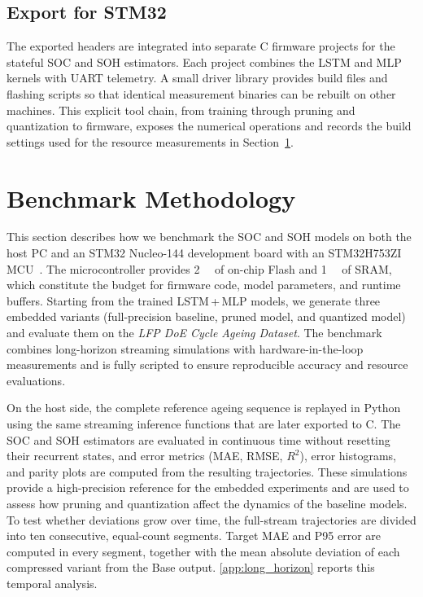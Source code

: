 \documentclass[final,3p,times]{elsarticle}
\begin{document}
\subsection{Export for STM32}
The exported headers are integrated into separate C firmware projects for the stateful SOC and SOH estimators. Each project combines the LSTM and MLP kernels with UART telemetry. A small driver library provides build files and flashing scripts so that identical measurement binaries can be rebuilt on other machines. This explicit tool chain, from training through pruning and quantization to firmware, exposes the numerical operations and records the build settings used for the resource measurements in Section~\ref{sec:kpis}.
\section{Benchmark Methodology}\label{sec:kpis}
This section describes how we benchmark the SOC and SOH models on both the host PC and an STM32 Nucleo-144 development board with an STM32H753ZI MCU~\cite{STM32Nucleo144Boards2025_Datasheet,naguibMicroprocessorExecutionTime2022}. The microcontroller provides \SI{2}{\mega\byte} of on-chip Flash and \SI{1}{\mega\byte} of SRAM, which constitute the budget for firmware code, model parameters, and runtime buffers. Starting from the trained LSTM\,+\,MLP models, we generate three embedded variants (full-precision baseline, pruned model, and quantized model) and evaluate them on the \emph{LFP DoE Cycle Ageing Dataset}. The benchmark combines long-horizon streaming simulations with hardware-in-the-loop measurements and is fully scripted to ensure reproducible accuracy and resource evaluations.

On the host side, the complete reference ageing sequence is replayed in Python using the same streaming inference functions that are later exported to C. The SOC and SOH estimators are evaluated in continuous time without resetting their recurrent states, and error metrics (MAE, RMSE, $R^2$), error histograms, and parity plots are computed from the resulting trajectories. These simulations provide a high-precision reference for the embedded experiments and are used to assess how pruning and quantization affect the dynamics of the baseline models. To test whether deviations grow over time, the full-stream trajectories are divided into ten consecutive, equal-count segments. Target MAE and P95 error are computed in every segment, together with the mean absolute deviation of each compressed variant from the Base output. \ref{app:long_horizon} reports this temporal analysis.
\end{document}
